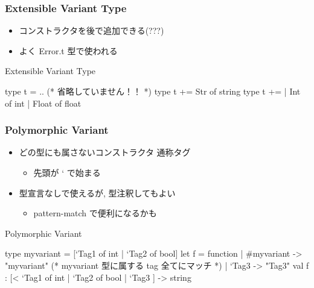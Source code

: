 \documentclass[dvipdfmx,14pt,notheorems,aspectratio=169]{beamer}
\theoremstyle{definition}
\begin{document}
    \begin{frame}[fragile]\frametitle{Extensible Variant Type}
        \begin{itemize}
            \item コンストラクタを後で追加できる(???)
            \item よく Error.t 型で使われる
        \end{itemize}
        \begin{exampleblock}{Extensible Variant Type}
            \scriptsize
            \begin{verbatimtab}
type t = .. (* 省略していません！！ *)
type t += Str of string
type t +=
    | Int of int
    | Float of float
\end{verbatimtab}
        \end{exampleblock}
    \end{frame}

    \begin{frame}[fragile]\frametitle{Polymorphic Variant}
        \begin{itemize}
            \item どの型にも属さないコンストラクタ 通称タグ
            \begin{itemize}
                \item 先頭が ` で始まる
            \end{itemize}
            \item 型宣言なしで使えるが, 型注釈してもよい
            \begin{itemize}
                \item pattern-match で便利になるかも
            \end{itemize}
        \end{itemize}
        \begin{exampleblock}{Polymorphic Variant}
            \scriptsize
            \begin{verbatimtab}
type myvariant = [`Tag1 of int | `Tag2 of bool]
let f = function
    | #myvariant -> "myvariant" (* myvariant 型に属する tag 全てにマッチ *)
    | `Tag3 -> "Tag3"
val f : [< `Tag1 of int | `Tag2 of bool | `Tag3 ] -> string
\end{verbatimtab}
        \end{exampleblock}
    \end{frame}
\end{document}
